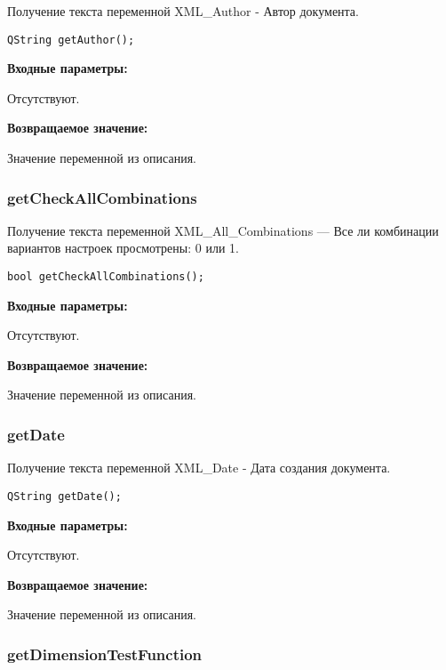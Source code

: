 \documentclass[a4paper,12pt]{article}
\begin{document}
Получение текста переменной XML\_Author - Автор документа.


\begin{lstlisting}[label=code_syntax_getAuthor,caption=Синтаксис]
QString getAuthor();
\end{lstlisting}

\textbf{Входные параметры:}

Отсутствуют.

\textbf{Возвращаемое значение:}

Значение переменной из описания.


\subsubsection{getCheckAllCombinations}\label{getCheckAllCombinations}

Получение текста переменной  XML\_All\_Combinations --- Все ли комбинации вариантов настроек просмотрены: 0 или 1.


\begin{lstlisting}[label=code_syntax_getCheckAllCombinations,caption=Синтаксис]
bool getCheckAllCombinations();
\end{lstlisting}

\textbf{Входные параметры:}

Отсутствуют.

\textbf{Возвращаемое значение:}

Значение переменной из описания.


\subsubsection{getDate}\label{getDate}

Получение текста переменной  XML\_Date - Дата создания документа.


\begin{lstlisting}[label=code_syntax_getDate,caption=Синтаксис]
QString getDate();
\end{lstlisting}

\textbf{Входные параметры:}

Отсутствуют.

\textbf{Возвращаемое значение:}

Значение переменной из описания.


\subsubsection{getDimensionTestFunction}\label{getDimensionTestFunction}
\end{document}
